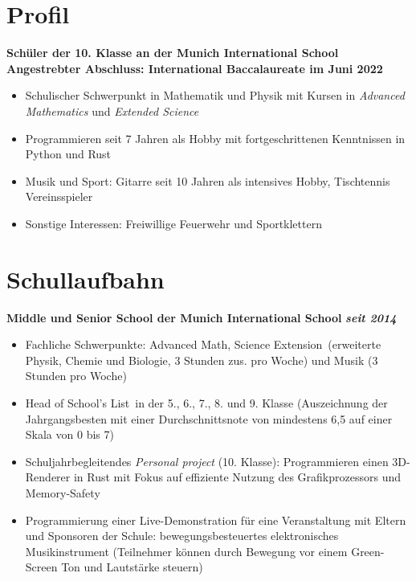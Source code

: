 \documentclass[12pt]{article}
\newcommand{\sect}[1]{
  {
    \vspace{12pt}
    \section*{
      \fontsize{18}{0}\selectfont
      \hspace{-12pt}
      \vspace{-12pt}
      #1
    }
    \vspace{-6pt}
  }
}
\begin{document}
\sect{Profil}
\vspace{6pt}

\textbf{Sch{\"u}ler der 10. Klasse an der Munich International School \\
  Angestrebter Abschluss: International Baccalaureate im Juni 2022}

\begin{itemize}[leftmargin=*]
  \itemsep0pt

\item Schulischer Schwerpunkt in Mathematik und Physik mit Kursen in \textit{\glqq
  Advanced Mathematics\grqq} und \textit{\glqq Extended Science\grqq}

\item Programmieren seit 7 Jahren als Hobby mit fortgeschrittenen Kenntnissen in
  Python und Rust

\item Musik und Sport: Gitarre seit 10 Jahren als intensives Hobby,
  Tischtennis Vereinsspieler

\item Sonstige Interessen: Freiwillige Feuerwehr und Sportklettern

\end{itemize}
\vspace{-24pt}

\sect{Schullaufbahn}
\vspace{6pt}

\textbf{Middle und Senior School der Munich International School} \hfill{\textit{\textbf{seit 2014}}}

\vspace{-6pt}
\begin{itemize}[leftmargin=*]
  \itemsep3pt

\item Fachliche Schwerpunkte: \glqq Advanced Math\grqq, \glqq Science
  Extension\grqq\, (erweiterte Physik, Chemie und Biologie, 3 Stunden zus. pro
  Woche) und Musik (3 Stunden pro Woche)
  
\item \glqq Head of School's List\grqq\, in der 5., 6., 7., 8. und 9. Klasse
  (Auszeichnung der Jahrgangsbesten mit einer Durchschnittsnote von mindestens
  6,5 auf einer Skala von 0 bis 7)
  
\item Schuljahrbegleitendes \textit{\glqq Personal project\grqq} (10. Klasse):
  Programmieren einen 3D-Renderer in Rust mit Fokus auf effiziente Nutzung
  des Grafikprozessors und Memory-Safety
  
\item Programmierung einer Live-Demonstration f{\"u}r eine Veranstaltung mit
  Eltern und Sponsoren der Schule: bewegungsbesteuertes elektronisches
  Musikinstrument (Teilnehmer k{\"o}nnen durch Bewegung vor
  einem Green-Screen Ton und Lautst{\"a}rke steuern)
\end{itemize}
\vspace{-6pt}
\end{document}

